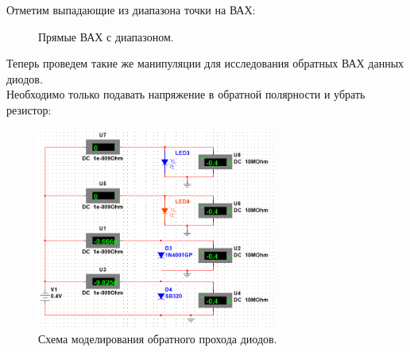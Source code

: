 \documentclass[12pt]{article}
\begin{document}
Отметим выпадающие из диапазона точки на ВАХ:
\begin{figure}[H]
    \centering
        \qquad
        \caption{Прямые ВАХ с диапазоном.}%
    \label{fig:example}
\end{figure}

Теперь проведем такие же манипуляции для исследования обратных ВАХ данных диодов. \\
Необходимо только подавать напряжение в обратной полярности и убрать резистор:
\begin{figure}[H]
    \centering
    \includegraphics[width=0.7\textwidth]{inv_scheme_all.png}
    \caption{Схема моделирования обратного прохода диодов.}
    \label{fig:inv_scheme_all}
\end{figure}
\end{document}
